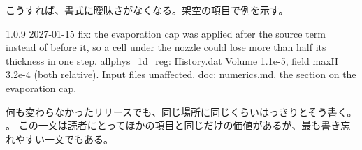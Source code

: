 こうすれば、書式に曖昧さがなくなる。架空の項目で例を示す。

\begin{plain}
1.0.9  2027-01-15
  fix: the evaporation cap was applied after the source term instead of before
       it, so a cell under the nozzle could lose more than half its thickness
       in one step.  allphys_1d_reg: History.dat Volume 1.1e-5, field maxH
       3.2e-4 (both relative).  Input files unaffected.
  doc: numerics.md, the section on the evaporation cap.
\end{plain}

何も変わらなかったリリースでも、同じ場所に同じくらいはっきりとそう書く。
。
この一文は読者にとってほかの項目と同じだけの価値があるが、最も書き忘れやすい一文でもある。
